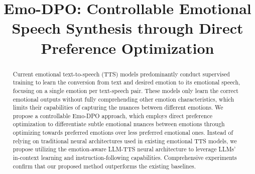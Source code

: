 \documentclass[conference]{IEEEtran}
\begin{document}
\title{Emo-DPO: Controllable Emotional Speech Synthesis through Direct Preference Optimization}

\author{
\and
{}
\and
{}
\and
{}
\and
{}
}
\maketitle
\vspace{-0.5cm}
\begin{abstract}
Current emotional text-to-speech (TTS) models predominantly conduct supervised training to learn the conversion from text and desired emotion to its emotional speech, focusing on a single emotion per text-speech pair. These models only learn the correct emotional outputs without fully comprehending other emotion characteristics, which limits their capabilities of capturing the nuances between different emotions.
We propose a controllable Emo-DPO approach, which employs direct preference optimization to differentiate subtle emotional nuances between emotions through optimizing towards preferred emotions over less preferred emotional ones.
Instead of relying on traditional neural architectures used in existing emotional TTS models, we propose utilizing the emotion-aware LLM-TTS neural architecture to leverage LLMs' in-context learning and instruction-following capabilities. Comprehensive experiments confirm that our proposed method outperforms the existing baselines. 
\end{abstract}
\end{document}
